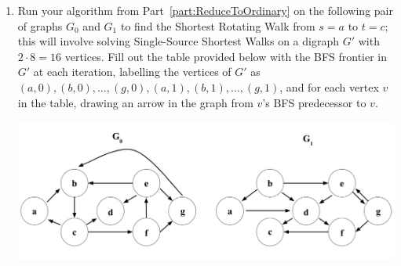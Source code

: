 \documentclass[11pt]{article}
\begin{document}
\begin{enumerate}
\begin{enumerate}
        \item \label{part:BFS} Run your algorithm from Part~\ref{part:ReduceToOrdinary} on the following pair of graphs $G_0$ and $G_1$ to find the Shortest Rotating Walk from $s=a$ to $t=c$; this will involve solving Single-Source Shortest Walks on a digraph $G'$ with $2\cdot 8=16$ vertices. Fill out the table provided below with the BFS frontier in $G'$ at each iteration, labelling the vertices of $G'$ as $(a, 0),(b, 0),\ldots,(g,0),(a,1),(b,1),\ldots,(g,1)$, and for each vertex $v$ in the table, drawing an arrow in the graph from $v$'s BFS predecessor to $v$. 

            \includegraphics[width=14cm]{ps4_graphs_new.png}


\end{enumerate}
\end{enumerate}
\end{document}
